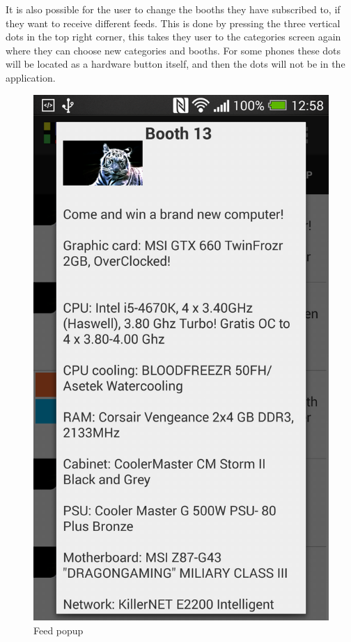 It is also possible for the user to change the booths they have subscribed to, if they want to receive different feeds. This is done by pressing the three vertical dots in the top right corner, this takes they user to the categories screen again where they can choose new categories and booths. For some phones these dots will be located as a hardware button itself, and then the dots will not be in the application.

\begin{figure}[H]
\begin{minipage}[b]{0.5\columnwidth}
\centering
\includegraphics[width=0.7\columnwidth]{img/finaldesign/feedspopup.png}
\caption{Feed popup}
\label{fig:popupfeed}
\end{minipage}
\hspace{0.5cm}
\begin{minipage}[b]{0.5\columnwidth}
\centering

\end{minipage}
\end{figure}
